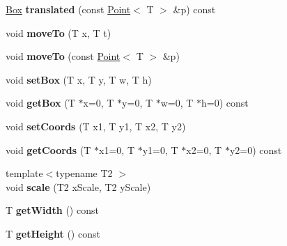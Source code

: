 \begin{DoxyCompactItemize}
\item 
\hypertarget{class_box_ac441f74500a5f381dd80639c683cfe7e}{
\hyperlink{class_box}{Box} {\bfseries translated} (const \hyperlink{class_point}{Point}$<$ T $>$ \&p) const }
\label{class_box_ac441f74500a5f381dd80639c683cfe7e}

\item 
\hypertarget{class_box_a484604d7fec04732de90ea55da3b7b6a}{
void {\bfseries moveTo} (T x, T t)}
\label{class_box_a484604d7fec04732de90ea55da3b7b6a}

\item 
\hypertarget{class_box_a3c7f973d21b9144b2b1d5a854f2aec9b}{
void {\bfseries moveTo} (const \hyperlink{class_point}{Point}$<$ T $>$ \&p)}
\label{class_box_a3c7f973d21b9144b2b1d5a854f2aec9b}

\item 
\hypertarget{class_box_a58b4172de656a853e63734c8501ca2d3}{
void {\bfseries setBox} (T x, T y, T w, T h)}
\label{class_box_a58b4172de656a853e63734c8501ca2d3}

\item 
\hypertarget{class_box_a2a5767d016fc9a5960f3e2a3c9fa5c89}{
void {\bfseries getBox} (T $\ast$x=0, T $\ast$y=0, T $\ast$w=0, T $\ast$h=0) const }
\label{class_box_a2a5767d016fc9a5960f3e2a3c9fa5c89}

\item 
\hypertarget{class_box_a34c9185bc13058d287f762f70a44738b}{
void {\bfseries setCoords} (T x1, T y1, T x2, T y2)}
\label{class_box_a34c9185bc13058d287f762f70a44738b}

\item 
\hypertarget{class_box_a08182031d00233aa02f6b9380d213c86}{
void {\bfseries getCoords} (T $\ast$x1=0, T $\ast$y1=0, T $\ast$x2=0, T $\ast$y2=0) const }
\label{class_box_a08182031d00233aa02f6b9380d213c86}

\item 
\hypertarget{class_box_a710290e5022b29be36491593d26e938d}{
{\footnotesize template$<$typename T2 $>$ }\\void {\bfseries scale} (T2 xScale, T2 yScale)}
\label{class_box_a710290e5022b29be36491593d26e938d}

\item 
\hypertarget{class_box_a25420c9b205a53b1345ff2dce6d2f351}{
T {\bfseries getWidth} () const }
\label{class_box_a25420c9b205a53b1345ff2dce6d2f351}

\item 
\hypertarget{class_box_a4658e043d83b5360bc186a73c1859313}{
T {\bfseries getHeight} () const }
\label{class_box_a4658e043d83b5360bc186a73c1859313}


\end{DoxyCompactItemize}
